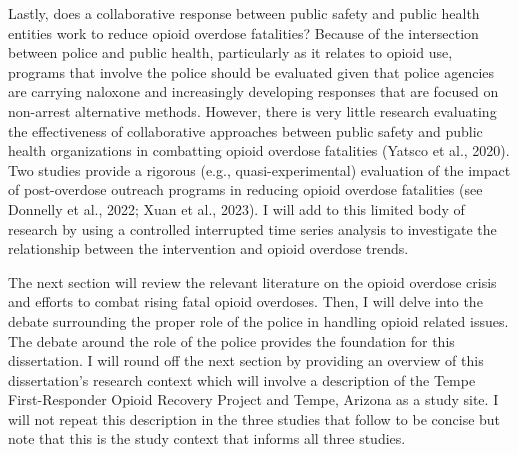 Lastly, does a collaborative response between public safety and public health entities work to reduce opioid overdose fatalities? Because of the intersection between police and public health, particularly as it relates to opioid use, programs that involve the police should be evaluated given that police agencies are carrying naloxone and increasingly developing responses that are focused on non-arrest alternative methods. However, there is very little research evaluating the effectiveness of collaborative approaches between public safety and public health organizations in combatting opioid overdose fatalities (Yatsco et al., 2020). Two studies provide a rigorous (e.g., quasi-experimental) evaluation of the impact of post-overdose outreach programs in reducing opioid overdose fatalities (see Donnelly et al., 2022; Xuan et al., 2023). I will add to this limited body of research by using a controlled interrupted time series analysis to investigate the relationship between the intervention and opioid overdose trends.

The next section will review the relevant literature on the opioid overdose crisis and efforts to combat rising fatal opioid overdoses. Then, I will delve into the debate surrounding the proper role of the police in handling opioid related issues. The debate around the role of the police provides the foundation for this dissertation. I will round off the next section by providing an overview of this dissertation's research context which will involve a description of the Tempe First-Responder Opioid Recovery Project and Tempe, Arizona as a study site. I will not repeat this description in the three studies that follow to be concise but note that this is the study context that informs all three studies.